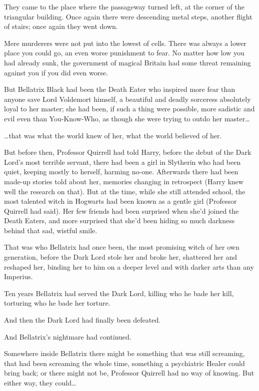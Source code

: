 They came to the place where the passageway turned left, at the corner of the triangular building. Once again there were descending metal steps, another flight of stairs; once again they went down.

Mere murderers were not put into the lowest of cells. There was always a lower place you could go, an even worse punishment to fear. No matter how low you had already sunk, the government of magical Britain had some threat remaining against you if you did even worse.

But Bellatrix Black had been the Death Eater who inspired more fear than anyone save Lord Voldemort himself, a beautiful and deadly sorceress absolutely loyal to her master; she had been, if such a thing were possible, more sadistic and evil even than You-Know-Who, as though she were trying to outdo her master{\ldots}

{\ldots}that was what the world knew of her, what the world believed of her.

But before then, Professor Quirrell had told Harry, before the debut of the Dark Lord's most terrible servant, there had been a girl in Slytherin who had been quiet, keeping mostly to herself, harming no-one. Afterwards there had been made-up stories told about her, memories changing in retrospect (Harry knew well the research on that). But at the time, while she still attended school, the most talented witch in Hogwarts had been known as a gentle girl (Professor Quirrell had said). Her few friends had been surprised when she'd joined the Death Eaters, and more surprised that she'd been hiding so much darkness behind that sad, wistful smile.

That was who Bellatrix had once been, the most promising witch of her own generation, before the Dark Lord stole her and broke her, shattered her and reshaped her, binding her to him on a deeper level and with darker arts than any Imperius.

Ten years Bellatrix had served the Dark Lord, killing who he bade her kill, torturing who he bade her torture.

And then the Dark Lord had finally been defeated.

And Bellatrix's nightmare had continued.

Somewhere inside Bellatrix there might be something that was still screaming, that had been screaming the whole time, something a psychiatric Healer could bring back; or there might not be, Professor Quirrell had no way of knowing. But either way, they could{\ldots}

